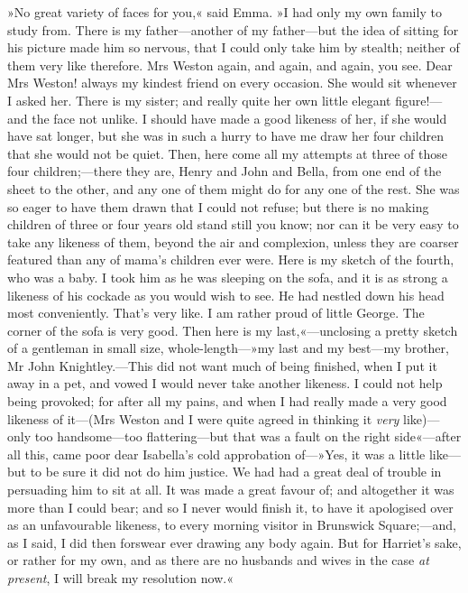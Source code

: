 »No great variety of faces for you,« said Emma. »I had only my own family to study from. There is my father—another of my father—but the idea of sitting for his picture made him so nervous, that I could only take him by stealth; neither of them very like therefore. Mrs Weston again, and again, and again, you see. Dear Mrs Weston! always my kindest friend on every occasion. She would sit whenever I asked her. There is my sister; and really quite her own little elegant figure!—and the face not unlike. I should have made a good likeness of her, if she would have sat longer, but she was in such a hurry to have me draw her four children that she would not be quiet. Then, here come all my attempts at three of those four children;—there they are, Henry and John and Bella, from one end of the sheet to the other, and any one of them might do for any one of the rest. She was so eager to have them drawn that I could not refuse; but there is no making children of three or four years old stand still you know; nor can it be very easy to take any likeness of them, beyond the air and complexion, unless they are coarser featured than any of mama's children ever were. Here is my sketch of the fourth, who was a baby. I took him as he was sleeping on the sofa, and it is as strong a likeness of his cockade as you would wish to see. He had nestled down his head most conveniently. That's very like. I am rather proud of little George. The corner of the sofa is very good. Then here is my last,«—unclosing a pretty sketch of a gentleman in small size, whole-length—»my last and my best—my brother, Mr John Knightley.—This did not want much of being finished, when I put it away in a pet, and vowed I would never take another likeness. I could not help being provoked; for after all my pains, and when I had really made a very good likeness of it—(Mrs Weston and I were quite agreed in thinking it \textit{very} like)—only too handsome—too flattering—but that was a fault on the right side«—after all this, came poor dear Isabella's cold approbation of—»Yes, it was a little like—but to be sure it did not do him justice. We had had a great deal of trouble in persuading him to sit at all. It was made a great favour of; and altogether it was more than I could bear; and so I never would finish it, to have it apologised over as an unfavourable likeness, to every morning visitor in Brunswick Square;—and, as I said, I did then forswear ever drawing any body again. But for Harriet's sake, or rather for my own, and as there are no husbands and wives in the case \textit{at present}, I will break my resolution now.«

